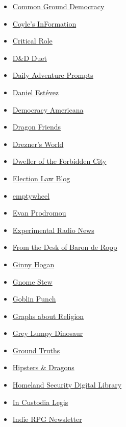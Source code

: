 \begin{itemize}
{  Vance}
\item
  \href{https://edwardbfoley.substack.com/}{Common Ground Democracy}
\item
  \href{https://kcoyle.blogspot.com/}{Coyle's InFormation}
\item
  \href{https://critrole.com/}{Critical Role}
\item
  \href{https://dndduet.com/}{D\&D Duet}
\item
  \href{https://dailyadventureprompts.tumblr.com/}{Daily Adventure
  Prompts}
\item
  \href{https://destevez.net/}{Daniel Estévez}
\item
  \href{https://thomaszimmer.substack.com/}{Democracy Americana}
\item
  \href{https://thedragonfriends.com/}{Dragon Friends}
\item
  \href{https://danieldrezner.substack.com/}{Drezner's World}
\item
  \href{http://dwelleroftheforbiddencity.blogspot.com/}{Dweller of the
  Forbidden City}
\item
  \href{https://electionlawblog.org/}{Election Law Blog}
\item
  \href{https://www.emptywheel.net/home/}{emptywheel}
\item
  \href{https://evanp.me/}{Evan Prodromou}
\item
  \href{https://www.experimentalradio.news/}{Experimental Radio News}
\item
  \href{https://baronderopp.substack.com/}{From the Desk of Baron de
  Ropp}
\item
  \href{https://ginnyhogan.substack.com/}{Ginny Hogan}
\item
  \href{https://gnomestew.com/}{Gnome Stew}
\item
  \href{https://goblinpunch.blogspot.com/}{Goblin Punch}
\item
  \href{https://www.graphsaboutreligion.com/}{Graphs about Religion}
\item
  \href{https://gld.mcphail.uk/}{Grey Lumpy Dinosaur}
\item
  \href{https://erictopol.substack.com/}{Ground Truths}
\item
  \href{https://www.hipstersanddragons.com/}{Hipsters \& Dragons}
\item
  \href{https://www.hsdl.org/c/}{Homeland Security Digital Library}
\item
  \href{https://blogs.loc.gov/law}{In Custodia Legis}
\item
  \href{https://ttrpg.in/}{Indie RPG Newsletter}

\end{itemize}

